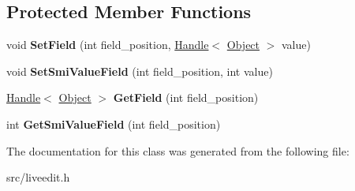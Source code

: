 \subsection*{Protected Member Functions}
\begin{DoxyCompactItemize}
\item 
\hypertarget{classv8_1_1internal_1_1_j_s_array_based_struct_a14217c3ef41671c329fb2c3d98fcdcc6}{}void {\bfseries Set\+Field} (int field\+\_\+position, \hyperlink{classv8_1_1internal_1_1_handle}{Handle}$<$ \hyperlink{classv8_1_1internal_1_1_object}{Object} $>$ value)\label{classv8_1_1internal_1_1_j_s_array_based_struct_a14217c3ef41671c329fb2c3d98fcdcc6}

\item 
\hypertarget{classv8_1_1internal_1_1_j_s_array_based_struct_a55544bc5706d1319d3a7799ea3dfa328}{}void {\bfseries Set\+Smi\+Value\+Field} (int field\+\_\+position, int value)\label{classv8_1_1internal_1_1_j_s_array_based_struct_a55544bc5706d1319d3a7799ea3dfa328}

\item 
\hypertarget{classv8_1_1internal_1_1_j_s_array_based_struct_ab86e2bb490cf245c84a5fe933bedcf85}{}\hyperlink{classv8_1_1internal_1_1_handle}{Handle}$<$ \hyperlink{classv8_1_1internal_1_1_object}{Object} $>$ {\bfseries Get\+Field} (int field\+\_\+position)\label{classv8_1_1internal_1_1_j_s_array_based_struct_ab86e2bb490cf245c84a5fe933bedcf85}

\item 
\hypertarget{classv8_1_1internal_1_1_j_s_array_based_struct_a1df722228329f7455e111d3ae49dccb6}{}int {\bfseries Get\+Smi\+Value\+Field} (int field\+\_\+position)\label{classv8_1_1internal_1_1_j_s_array_based_struct_a1df722228329f7455e111d3ae49dccb6}

\end{DoxyCompactItemize}


The documentation for this class was generated from the following file\+:\begin{DoxyCompactItemize}
\item 
src/liveedit.\+h\end{DoxyCompactItemize}
